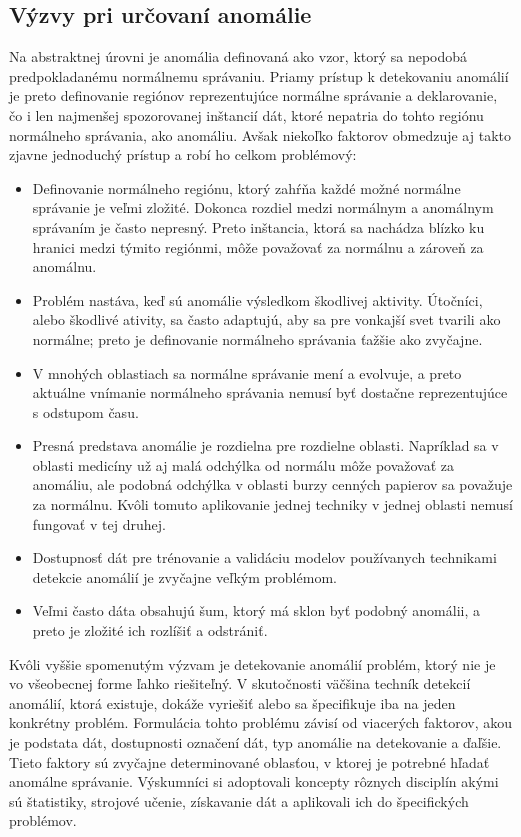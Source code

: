 \subsection{Výzvy pri určovaní anomálie}
Na abstraktnej úrovni je anomália definovaná ako vzor, ktorý sa nepodobá predpokladanému normálnemu správaniu. Priamy prístup k detekovaniu anomálií je preto definovanie regiónov reprezentujúce normálne správanie a deklarovanie, čo i len najmenšej spozorovanej inštancií dát, ktoré nepatria do tohto regiónu normálneho správania, ako anomáliu. Avšak niekoľko faktorov obmedzuje aj takto zjavne jednoduchý prístup a robí ho celkom problémový:
\begin{itemize}
    \item Definovanie normálneho regiónu, ktorý zahŕňa každé možné normálne správanie je veľmi zložité. Dokonca rozdiel medzi normálnym a anomálnym správaním je často nepresný. Preto inštancia, ktorá sa nachádza blízko ku hranici medzi týmito regiónmi, môže považovať za normálnu a  zároveň za anomálnu.
    \item Problém nastáva, keď sú anomálie výsledkom škodlivej aktivity. Útočníci, alebo škodlivé ativity, sa často adaptujú, aby sa pre vonkajší svet tvarili  ako normálne; preto je definovanie normálneho správania ťažšie ako zvyčajne.
    \item V mnohých oblastiach sa normálne správanie mení a evolvuje, a preto aktuálne vnímanie normálneho správania nemusí byť dostačne reprezentujúce s odstupom času.
    \item Presná predstava anomálie je rozdielna pre rozdielne oblasti. Napríklad sa v oblasti medicíny  už aj malá odchýlka od normálu môže považovať za anomáliu, ale podobná odchýlka v oblasti burzy cenných papierov sa považuje za normálnu. Kvôli tomuto aplikovanie jednej techniky v jednej oblasti nemusí fungovať v tej druhej.
    \item Dostupnosť  dát pre trénovanie a validáciu modelov používanych technikami detekcie anomálií je zvyčajne veľkým problémom.
    \item Veľmi často dáta obsahujú šum, ktorý má sklon byť podobný anomálii, a preto je zložité ich rozlíšiť a odstrániť.
\end{itemize} \par
Kvôli vyššie spomenutým výzvam je detekovanie anomálií problém, ktorý nie je vo všeobecnej forme ľahko riešiteľný. V skutočnosti väčšina techník detekcií anomálií, ktorá existuje, dokáže vyriešiť alebo sa špecifikuje iba na jeden konkrétny problém. Formulácia tohto problému závisí od viacerých faktorov, akou je podstata dát, dostupnosti označení dát, typ anomálie na detekovanie a ďaľšie. Tieto faktory sú zvyčajne determinované oblasťou, v ktorej je potrebné hľadať anomálne správanie. Výskumníci si adoptovali koncepty rôznych disciplín akými sú štatistiky, strojové učenie, získavanie dát a aplikovali ich do špecifických problémov.\cite{Chandola}

